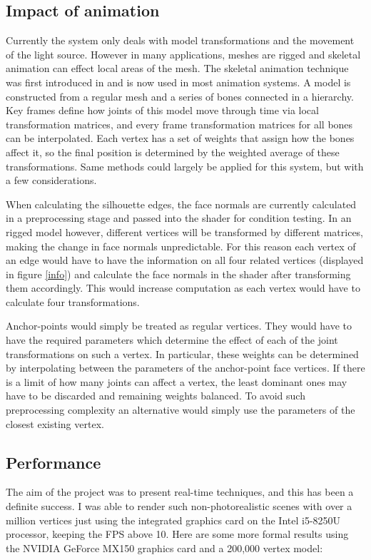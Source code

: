 \documentclass[a4paper, 12pt]{article}
\begin{document}
\subsection{Impact of animation}
Currently the system only deals with model transformations and the movement of the light source. However in many applications, meshes are rigged and skeletal animation can effect local areas of the mesh. The skeletal animation technique was first introduced in \cite{Thalmann1989} and is now used in most animation systems. A model is constructed from a regular mesh and a series of bones connected in a hierarchy. Key frames define how joints of this model move through time via local transformation matrices, and every frame transformation matrices for all bones can be interpolated. Each vertex has a set of weights that assign how the bones affect it, so the final position is determined by the weighted average of these transformations. Same methods could largely be applied for this system, but with a few considerations.

When calculating the silhouette edges, the face normals are currently calculated in a preprocessing stage and passed into the shader for condition testing. In an rigged model however, different vertices will be transformed by different matrices, making the change in face normals unpredictable. For this reason each vertex of an edge would have to have the information on all four related vertices (displayed in figure \ref{info}) and calculate the face normals in the shader after transforming them accordingly. This would increase computation as each vertex would have to calculate four transformations.

Anchor-points would simply be treated as regular vertices. They would have to have the required parameters which determine the effect of each of the joint transformations on such a vertex. In particular, these weights can be determined by interpolating between the parameters of the anchor-point face vertices. If there is a limit of how many joints can affect a vertex, the least dominant ones may have to be discarded and remaining weights balanced. To avoid such preprocessing complexity an alternative would simply use the parameters of the closest existing vertex.

\subsection{Performance}
The aim of the project was to present real-time techniques, and this has been a definite success. I was able to render such non-photorealistic scenes with over a million vertices just using the integrated graphics card on the Intel i5-8250U processor, keeping the FPS above 10. Here are some more formal results using the NVIDIA GeForce MX150 graphics card and a 200,000 vertex model:
\end{document}
